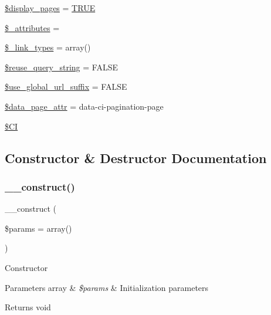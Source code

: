 \begin{DoxyCompactItemize}
\item 
\mbox{\hyperlink{class_c_i___pagination_ab68f1bc9a7442f1936286f05b7ba175d}{\$display\+\_\+pages}} = \mbox{\hyperlink{constants_8php_ae04a3efe6aa42044f803ee90c2277846}{T\+R\+UE}}
\item 
\mbox{\hyperlink{class_c_i___pagination_a891d1c35cfe08f5bf9eb53043b78035d}{\$\+\_\+attributes}} = \textquotesingle{}\textquotesingle{}
\item 
\mbox{\hyperlink{class_c_i___pagination_a6bb16f8a41b808305d99487eaf429717}{\$\+\_\+link\+\_\+types}} = array()
\item 
\mbox{\hyperlink{class_c_i___pagination_aaca516d12ed63aa4523ab88dd46e067d}{\$reuse\+\_\+query\+\_\+string}} = F\+A\+L\+SE
\item 
\mbox{\hyperlink{class_c_i___pagination_aa2ec11ced927cd6f4e62fa19a4e35325}{\$use\+\_\+global\+\_\+url\+\_\+suffix}} = F\+A\+L\+SE
\item 
\mbox{\hyperlink{class_c_i___pagination_a3bbb05bafee2889f825aa40dcd684426}{\$data\+\_\+page\+\_\+attr}} = \textquotesingle{}data-\/ci-\/pagination-\/page\textquotesingle{}
\item 
\mbox{\hyperlink{class_c_i___pagination_ae0314d046ddf7fcfaec03222977427d3}{\$\+CI}}
\end{DoxyCompactItemize}


\subsection{Constructor \& Destructor Documentation}
\mbox{\label{class_c_i___pagination_a568ecdb0d73d2a870f33189739922a50}} 
\subsubsection{\texorpdfstring{\+\_\+\+\_\+construct()}{\_\_construct()}}
{\footnotesize\ttfamily \+\_\+\+\_\+construct (\begin{DoxyParamCaption}\item[{}]{\$params = {\ttfamily array()} }\end{DoxyParamCaption})}

Constructor


\begin{DoxyParams}[1]{Parameters}
array & {\em \$params} & Initialization parameters \\
\hline
\end{DoxyParams}
\begin{DoxyReturn}{Returns}
void 
\end{DoxyReturn}


